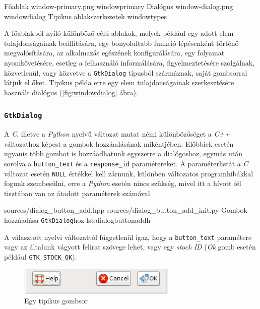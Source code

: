 {Főablak}
{window-primary.png}
{windowprimary}
{Dialógus}
{window-dialog.png}
{windowdialog}
{Tipikus ablakszerkezetek\cite{gnomehig}}
{windowtypes}

A főablakból nyíló különböző célú ablakok, melyek például egy adott elem tulajdonságainak beállítására, egy bonyolultabb funkció lépésenként történő megvalósítására, az alkalmazás egészének konfigurálására, egy folyamat nyomkövetésére, esetleg a felhasználó informálására, figyelmeztetésére szolgálnak, közvetlenül, vagy közvetve a \texttt{GtkDialog} típusból szármáznak, saját gombsorral látjuk el őket. Tipikus példa erre egy elem tulajdonságainak szerkesztésére használt dialógus (\ref{fig:windowdialog} ábra).

\subsubsection{\texttt{GtkDialog}}
\label{sec:dialogbuttonadd}

A \textit{C}, illetve a \textit{Python} nyelvű változat mutat némi különbözőséget a \textit{C++} változathoz képest a gombok hozzáadásának mikéntjében. Előbbiek esetén ugyanis több gombot is hozzáadhatunk egyszerre a dialógoshoz, egymás után sorolva a \texttt{button\_text} és a \texttt{response\_id} paramétereket. A paraméterlistát a \textit{C} változat esetén \texttt{NULL} értékkel kell zárnunk, különben változatos programhibákkal fogunk szembesülni, erre a \textit{Python} esetén nincs szükség, mivel itt a hívott fél tisztában van az átadott paraméterek számával.

{sources/dialog_button_add.hpp}
{sources/dialog_button_add_init.py}
{Gombok hozzáadása \texttt{GtkDialog}hoz}
{lst:dialogbuttonaddh}

A választott nyelvi változattól függetlenül igaz, hogy a \texttt{button\_text} paramétere vagy az általunk vágyott felirat szövege lehet, vagy egy \textit{stock ID} (\textit{Ok} gomb esetén például \texttt{GTK\_STOCK\_OK}).

\begin{figure}[H]
\begin{center}
\includegraphics[height=13mm]{images/button-alternate.png}
\caption{Egy tipikus gombsor}
\end{center}
\end{figure}

